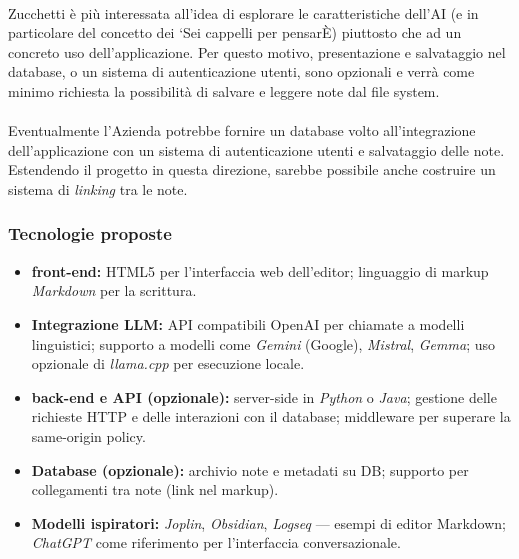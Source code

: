 \documentclass[a4paper,11pt]{article}
\begin{document}
\paragraph{}
Zucchetti è più interessata all'idea di esplorare le caratteristiche dell'AI (e in particolare del concetto dei `Sei cappelli per pensarÈ) piuttosto che ad un concreto uso dell'applicazione. Per questo motivo,
presentazione e salvataggio nel database, o un sistema di autenticazione utenti, sono opzionali e verrà come minimo richiesta la possibilità di salvare e leggere note dal file system.
\paragraph{}
Eventualmente l'Azienda potrebbe fornire un database volto all'integrazione dell'applicazione con un sistema di autenticazione utenti e salvataggio delle note. 
Estendendo il progetto in questa direzione, sarebbe possibile anche costruire un sistema di \textit{linking} tra le note.
\subsubsection{Tecnologie proposte}
\begin{itemize}[noitemsep, topsep=0pt]
 \item \textbf{front-end:} HTML5 per l'interfaccia web dell'editor; linguaggio di markup \textit{Markdown} per la scrittura.
 \item \textbf{Integrazione LLM:} API compatibili OpenAI per chiamate a modelli linguistici; supporto a modelli come \textit{Gemini} (Google), \textit{Mistral}, \textit{Gemma}; uso opzionale di \textit{llama.cpp} per esecuzione locale.
 \item \textbf{back-end e API (opzionale):} server-side in \textit{Python} o \textit{Java}; gestione delle richieste HTTP e delle interazioni con il database; middleware per superare la same-origin policy.
 \item \textbf{Database (opzionale):} archivio note e metadati su DB; supporto per collegamenti tra note (link nel markup).
 \item \textbf{Modelli ispiratori:} \textit{Joplin}, \textit{Obsidian}, \textit{Logseq} — esempi di editor Markdown; \textit{ChatGPT} come riferimento per l'interfaccia conversazionale.
\end{itemize}
\end{document}
